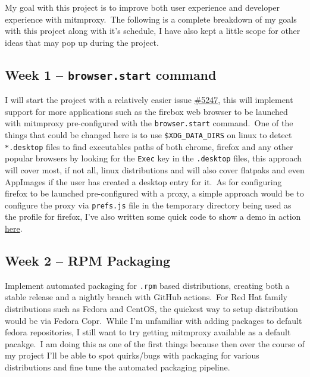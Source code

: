 
My goal with this project is to improve both user experience and developer experience with mitmproxy.\ The
following is a complete breakdown of my goals with this project along with it's schedule, I have also kept a little
scope for other ideas that may pop up during the project.


\subsection{Week 1 -- \texttt{browser.start} command}
\label{subsec:week-1}

I will start the project with a relatively easier issue
\href{https://github.com/mitmproxy/mitmproxy/issues/5247}{\#5247},
this will implement support for more applications such as the firebox web browser to be launched with mitmproxy
pre-configured with the \texttt{browser.start} command.\ One of the things that could be changed here is to use
\texttt{\$XDG\_DATA\_DIRS} on linux to detect \texttt{*.desktop} files to find executables paths of both chrome,
firefox and any other popular browsers by looking for the \texttt{Exec} key in the \texttt{.desktop} files, this
approach will cover most, if not all, linux distributions and will also cover flatpaks and even AppImages if the user
has created a desktop entry for it.\ As for configuring firefox to be launched pre-configured with a proxy, a simple
approach would be to configure the proxy via \texttt{prefs.js} file in the temporary directory being used as the
profile for firefox, I've also written some quick code to show a demo in action
\href{https://github.com/sujaldev/mitmproxy/blob/demo-firefox/mitmproxy/addons/browser.py}{here}.


\subsection{Week 2 -- RPM Packaging}
\label{subsec:week-2}

Implement automated packaging for \texttt{.rpm} based distributions, creating both a stable release and a nightly
branch with GitHub actions.\ For Red Hat family distributions such as Fedora and CentOS, the quickest way to setup
distribution would be via Fedora Copr.\ While I'm unfamiliar with adding packages to default fedora repositories,
I still want to try getting mitmproxy available as a default pacakge.\ I am doing this as one of the first things
because then over the course of my project I'll be able to spot quirks/bugs with packaging for various
distributions and fine tune the automated packaging pipeline.

